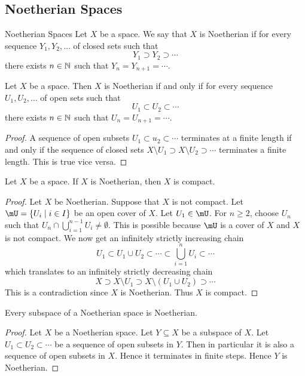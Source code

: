 \documentclass[a4paper]{article}
\begin{document}
\subsection{Noetherian Spaces}
\begin{defn}{Noetherian Spaces}{} Let $X$ be a space. We say that $X$ is Noetherian if for every sequence $Y_1,Y_2,\dots$ of closed sets such that $$Y_1\supset Y_2\supset\cdots$$ there exists $n\in\mathbb{N}$ such that $Y_n=Y_{n+1}=\cdots$. 
\end{defn}

\begin{prp}{}{} Let $X$ be a space. Then $X$ is Noetherian if and only if for every sequence $U_1,U_2,\dots$ of open sets such that $$U_1\subset U_2\subset\cdots$$ there exists $n\in\mathbb{N}$ such that $U_n=U_{n+1}=\cdots$. 
\begin{proof}
A sequence of open subsets $U_1\subset u_2\subset\cdots$ terminates at a finite length if and only if the sequence of closed sets $X\setminus U_1\supset X\setminus U_2\supset\cdots$ terminates a finite length. This is true vice versa. 
\end{proof}
\end{prp}

\begin{prp}{}{} Let $X$ be a space. If $X$ is Noetherian, then $X$ is compact. 
\begin{proof}
Let $X$ be Noetherian. Suppose that $X$ is not compact. Let $\mU=\{U_i\;|\;i\in I\}$ be an open cover of $X$. Let $U_1\in\mU$. For $n\geq 2$, choose $U_n$ such that $U_n\cap\bigcup_{i=1}^{n-1}U_i\neq\emptyset$. This is possible because $\mU$ is a cover of $X$ and $X$ is not compact. We now get an infinitely strictly increasing chain $$U_1\subset U_1\cup U_2\subset\cdots\subset\bigcup_{i=1}^nU_i\subset\cdots$$ which translates to an infinitely strictly decreasing chain $$X\supset X\setminus U_1\supset X\setminus(U_1\cup U_2)\supset\cdots$$ This is a contradiction since $X$ is Noetherian. Thus $X$ is compact. 
\end{proof}
\end{prp}

\begin{prp}{}{} Every subspace of a Noetherian space is Noetherian. 
\begin{proof}
Let $X$ be a Noetherian space. Let $Y\subseteq X$ be a subspace of $X$. Let $U_1\subset U_2\subset\cdots$ be a sequence of open subsets in $Y$. Then in particular it is also a sequence of open subsets in $X$. Hence it terminates in finite steps. Hence $Y$ is Noetherian. 
\end{proof}
\end{prp}
\end{document}
